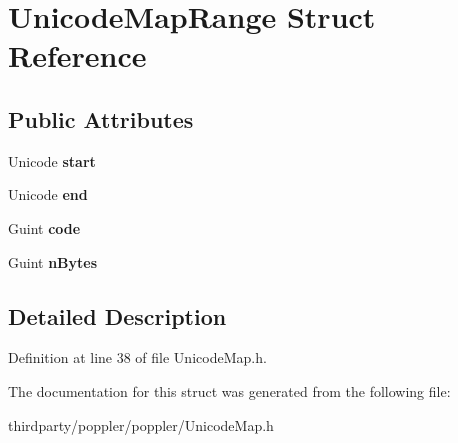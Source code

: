 \hypertarget{struct_unicode_map_range}{}\section{Unicode\+Map\+Range Struct Reference}
\label{struct_unicode_map_range}
\subsection*{Public Attributes}
\begin{DoxyCompactItemize}
\item 
\mbox{\label{struct_unicode_map_range_a450a133778d1f93f958bc0f10004606b}} 
Unicode {\bfseries start}
\item 
\mbox{\label{struct_unicode_map_range_ae0611935c158b5bc5eb2206a0056d690}} 
Unicode {\bfseries end}
\item 
\mbox{\label{struct_unicode_map_range_ab4bf0bd9e3f3f4b3a76601452b791252}} 
Guint {\bfseries code}
\item 
\mbox{\label{struct_unicode_map_range_a0d77984bdbc792f10fe1b4ea7bd6786b}} 
Guint {\bfseries n\+Bytes}
\end{DoxyCompactItemize}


\subsection{Detailed Description}


Definition at line 38 of file Unicode\+Map.\+h.



The documentation for this struct was generated from the following file\+:\begin{DoxyCompactItemize}
\item 
thirdparty/poppler/poppler/Unicode\+Map.\+h\end{DoxyCompactItemize}
